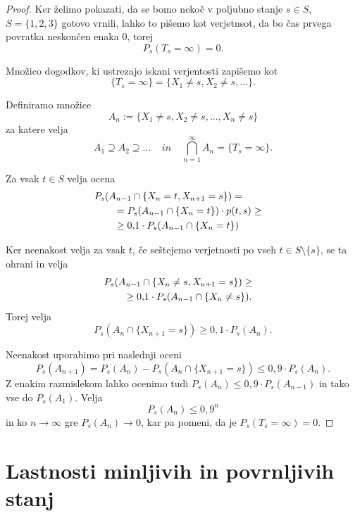 \documentclass[a4paper,12pt]{article}
\begin{document}
\begin{proof}

Ker želimo pokazati, da se bomo nekoč v poljubno stanje $s \in S$, $S=\{1, 2, 3\}$ gotovo vrnili, lahko to pišemo kot
verjetnsot, da bo čas prvega povratka neskončen enaka 0, torej
 $$P_s(T_s = \infty) = 0.$$

Množico dogodkov, ki ustrezajo iskani verjentosti zapišemo kot
$$\{T_s = \infty\} = \{ X_1 \neq s, X_2 \neq s, ...\}.$$



Definiramo množice $$A_n := \{X_1 \neq s, X_2 \neq s, ..., X_n \neq s\}$$ za katere velja 
$$A_1 \supseteq A_2 \supseteq ... \ \ \ \ \  in \ \ \ \ \  \bigcap_{n = 1}^{\infty}A_n = \{T_s = \infty\}.$$



Za vsak $t \in S$ velja ocena
\begin{align*}
    \lefteqn{P_s(A_{n-1} \cap \{X_n = t, X_{n+1}=s\})=} \qquad
    \\& = P_s(A_{n-1} \cap \{X_n = t\}) \cdot p(t,s) \ge
    \\& \ge 0{,}1 \cdot P_s(A_{n-1} \cap \{X_n = t\}) 
\end{align*}


    Ker neenakost velja za vsak $t$, če seštejemo verjetnosti po vseh $t \in S\setminus\{s\}$, se ta ohrani in velja 
\begin{align*}
    \lefteqn{P_s(A_{n-1} \cap \{X_n \neq s, X_{n+1} = s \}) \ge} \qquad
    \\& \ge 0{,}1 \cdot P_s(A_{n-1} \cap \{X_n \neq s\}). 
\end{align*}
Torej velja
 $$P_s(A_n \cap \{ X_{n+1} = s\}) \ge 0{,}1 \cdot P_s(A_n).$$ 



Neenakost uporabimo pri naslednji oceni 
    $$ P_s(A_{n+1}) = P_s(A_n) - P_s(A_n \cap \{X_{n+1} = s\})\le 0{,}9 \cdot P_s(A_n). $$
Z enakim razmislekom lahko ocenimo tudi $P_s(A_n) \le 0{,}9 \cdot P_s(A_{n-1})$ in tako vse do $P_s(A_1)$. Velja
    $$P_s(A_n) \le 0{,}9^n$$
in ko $n \rightarrow \infty$ gre $P_s(A_n) \rightarrow 0$, kar pa pomeni, da je $P_s(T_s = \infty) = 0.$

\end{proof}





\newpage
\section{Lastnosti minljivih in povrnljivih stanj}
\end{document}
